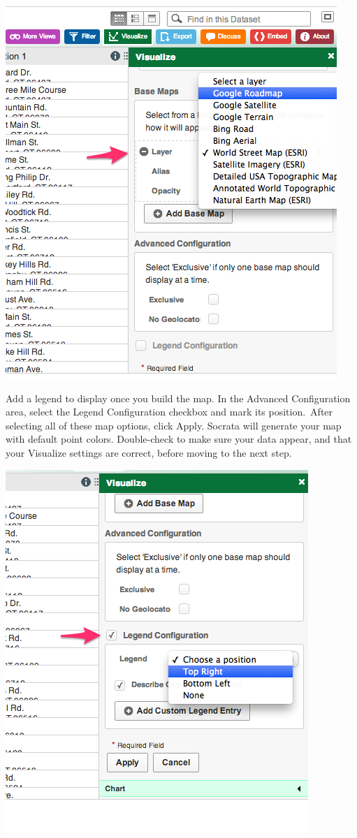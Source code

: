 \documentclass[
  english,
]{book}
\begin{document}
\includegraphics{images/06-map/SocrataMap7.png}

Add a legend to display once you build the map. In the Advanced Configuration area, select the Legend Configuration checkbox and mark its position.~After selecting all of these map options, click Apply. Socrata will generate your map with default point colors. Double-check to make sure your data appear, and that your Visualize settings are correct, before moving to the next step.

\includegraphics{images/06-map/SocrataMap8.png}
\end{document}
